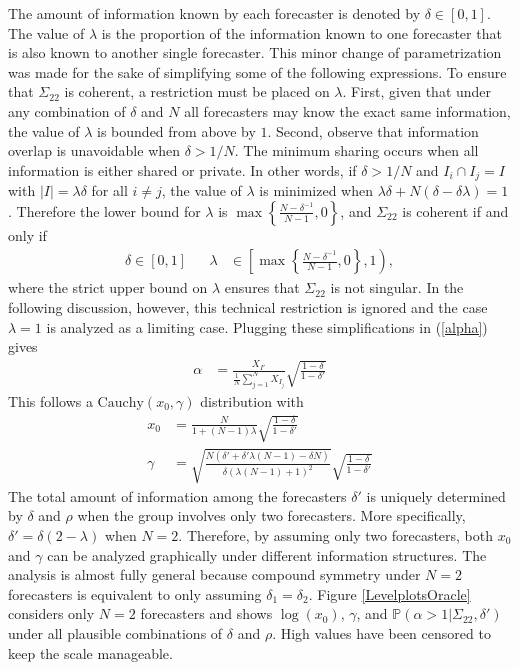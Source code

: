 \documentclass[11pt]{article}
\renewcommand{\P}{\mathbb{P}}
\theoremstyle{definition}
\theoremstyle{definition}
\def\P{{\mathbb P}}
\begin{document}
The amount of information known by each forecaster is denoted 
by $\delta \in [0,1]$.  The value of $\lambda$ is the proportion 
of the information known to one forecaster that is also known to
another single forecaster.  This minor change of parametrization 
was made for the sake of simplifying some of the following expressions. 
To ensure that $\Sigma_{22}$ is coherent, a restriction must 
be placed on $\lambda$. 
First, given that under any combination of $\delta$ and $N$ all forecasters 
may know the exact same information, the value of $\lambda$ is 
bounded from above by $1$. Second, observe that information overlap 
is unavoidable when $\delta > 1/N$.  The minimum sharing occurs when 
all information is either shared or private.  In other words, 
if $\delta > 1/N$ and $I_{i} \cap I_j = I$ with $|I| =  \lambda \delta$ 
for all $i \neq j$, the value of $\lambda$ is minimized when 
$\lambda\delta + N(\delta - \delta\lambda) = 1$.  Therefore the 
lower bound for $\lambda$ is $\max \left\{ \frac{N-\delta^{-1}}{N-1}, 
0\right\}$, and $\Sigma_{22}$ is coherent if and only if
\begin{align}
\delta \in [0,1] &&  \lambda &\in \left[  
   \max \left\{ \frac{N-\delta^{-1}}{N-1}, 0\right\}, 1 \right), 
   \label{rhoDomain}
\end{align}
where the strict upper bound on $\lambda$ ensures that
$\Sigma_{22}$ is not singular.  In the following discussion, 
however, this technical restriction is ignored and the case 
$\lambda = 1$ is analyzed as a limiting case.
Plugging these simplifications in (\ref{alpha}) gives 
\begin{align*}
\alpha &= \frac{X_{I'}}{\frac{1}{N}\sum_{j=1}^N X_{I_j}} 
  \sqrt{\frac{1-\delta}{1-\delta'}} 
\end{align*}
This follows a $\text{Cauchy}(x_0, \gamma)$ distribution with
\begin{align*}
x_0 &= \frac{N}{1+(N-1)\lambda}  \sqrt{\frac{1-\delta}{1-\delta'}}\\[2ex]
  \gamma &=  \sqrt{\frac{N(\delta' + \delta' \lambda (N-1) - \delta N)}
  {\delta (\lambda (N-1) + 1)^2}}\sqrt{\frac{1-\delta}{1-\delta'}}
\end{align*}
The total amount of information among the forecasters $\delta'$ is uniquely determined by $\delta$ and $\rho$ when the group involves only two forecasters. More specifically, $\delta' = \delta(2 - \lambda)$ when $N=2$. Therefore, by assuming only two forecasters, both $x_0$ and $\gamma$ can be analyzed graphically under different information structures. The analysis is almost fully general because compound symmetry under $N = 2$ forecasters is equivalent to only assuming $\delta_1 = \delta_2$. Figure \ref{LevelplotsOracle} considers only $N=2$ forecasters and shows $\log(x_0)$, $\gamma$, and $\P(\alpha > 1 | \Sigma_{22}, \delta')$ under all plausible combinations of $\delta$ and $\rho$. High values have been censored to keep the scale manageable. 
\end{document}
